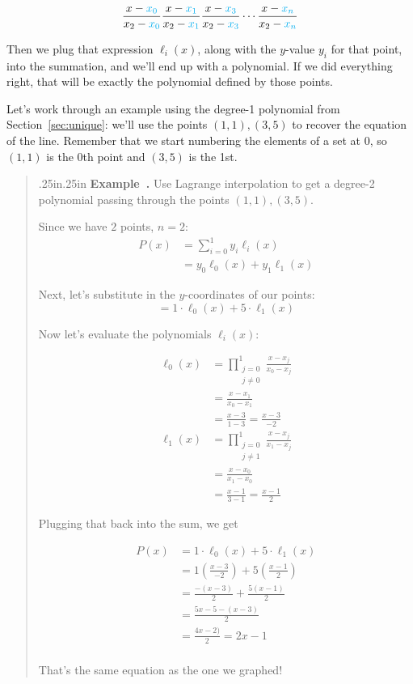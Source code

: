 \documentclass[12 pt]{article}
\newcounter{example}[section]
\newenvironment{example}{\refstepcounter{example}\par\bigskip \begin{quotation}{}{\leftmargin .25in\rightmargin .25in}
    \noindent \textbf{Example~\thesection.\theexample }  \rmfamily}{\end{quotation}\par\bigskip}
\begin{document}
\newcommand{\cyan}[1]{\textcolor{cyan}{#1}}
\[
    \frac{x-\cyan{x_0}}{x_2-\cyan{x_0}}
    \frac{x-\cyan{x_1}}{x_2-\cyan{x_1}}
    \frac{x-\cyan{x_3}}{x_2-\cyan{x_3}}
    \cdots
    \frac{x-\cyan{x_n}}{x_2-\cyan{x_n}}
\]

Then we plug that expression $\ell_i(x)$, along with the $y$-value $y_i$ 
for that point, into the summation, and we'll end up with a polynomial. 
If we did everything right, that will be exactly the polynomial defined 
by those points.

Let's work through an example using the degree-1 polynomial from Section~\ref{sec:unique}:
we'll use the points $(1,1), (3,5)$ to recover the equation of the line. Remember that we 
start numbering the elements of a set at 0, so $(1,1)$ is the 0th point and $(3,5)$ is 
the 1st.

\begin{example}
Use Lagrange interpolation to get a degree-2 polynomial passing through the points 
$(1,1), (3,5)$.

Since we have $2$ points, $n=2$:
\begin{align*}
    P(x) &= \sum_{i=0}^{1} y_i \ell_i(x)\\
    &= y_0 \ell_0(x) + y_1 \ell_1(x)
\end{align*}

Next, let's substitute in the $y$-coordinates of our points:
\[
    = 1 \cdot \ell_0(x) + 5 \cdot \ell_1(x)
\]

Now let's evaluate the polynomials $\ell_i(x)$:

\begin{align*}
    \ell_0(x) &= \prod_{\substack{j=0\\j\neq 0}}^{1} \frac{x-x_j}{x_0-x_j}\\
    &= \frac{x-x_1}{x_0-x_1}\\
    &= \frac{x-3}{1-3}
    = \frac{x-3}{-2}\\
    \ell_1(x) &= \prod_{\substack{j=0\\j\neq 1}}^{1} \frac{x-x_j}{x_1-x_j}\\
    &= \frac{x-x_0}{x_1-x_0}\\
    &= \frac{x-1}{3-1}
    = \frac{x-1}{2}
\end{align*}

Plugging that back into the sum, we get

\begin{align*}
    P(x) &= 1 \cdot \ell_0(x) + 5 \cdot \ell_1(x)\\
    &= 1 \left(\frac{x-3}{-2}\right) + 5 \left(\frac{x-1}{2}\right)\\
    &= \frac{-(x-3)}{2} + \frac{5(x-1)}{2}\\
    &= \frac{5x-5-(x-3)}{2}\\
    &= \frac{4x-2)}{2}
    = 2x-1\\
\end{align*}

That's the same equation as the one we graphed!
\end{example}
\end{document}

